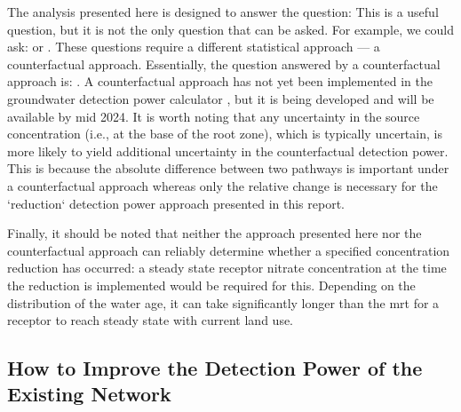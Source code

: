 The analysis presented here is designed to answer the question:  This is a useful question, but it is not the only question that can be asked.
For example, we could ask:  or .
These questions require a different statistical approach --- a counterfactual approach.
Essentially, the question answered by a counterfactual approach is: .
A counterfactual approach has not yet been implemented in the groundwater detection power calculator \citep{dumont_komanawagw_detect_power_2023}, but it is being developed and will be available by mid 2024.
It is worth noting that any uncertainty in the source concentration (i.e., at the base of the root zone), which is typically uncertain, is more likely to yield additional uncertainty in the counterfactual detection power.
This is because the absolute difference between two pathways is important under a counterfactual approach whereas only the relative change is necessary for the `reduction` detection power approach presented in this report.

Finally, it should be noted that neither the approach presented here nor the counterfactual approach can reliably determine whether a specified concentration reduction has occurred: a steady state receptor nitrate concentration at the time the reduction is implemented would be required for this. Depending on the distribution of the water age, it can take significantly longer than the \gls{mrt} for a receptor to reach steady state with current land use.

\subsection[Possible Network Improvements]{How to Improve the Detection Power of the Existing Network}

